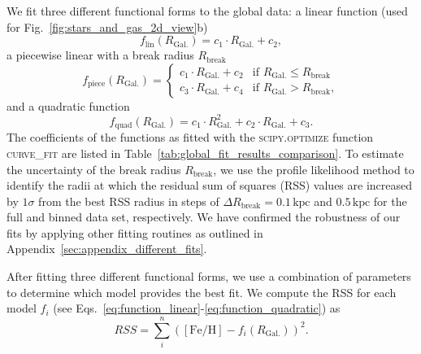 \documentclass[twocolumn,apj,numberedappendix,appendixfloats]{openjournal}
\begin{document}
\begin{CJK*}{UTF8}{gbsn}
We fit three different functional forms to the global data: a linear function (used for Fig.~\ref{fig:stars_and_gas_2d_view}b)
\begin{equation}
f_{\text{lin}}(R_\mathrm{Gal.}) = c_1 \cdot R_\mathrm{Gal.} + c_2, \label{eq:function_linear}
\end{equation}
a piecewise linear with a break radius $R_\mathrm{break}$
\begin{equation}
f_{\text{piece}}(R_\mathrm{Gal.}) = 
\begin{cases} 
c_1 \cdot R_\mathrm{Gal.} + c_2 & \text{if } R_\mathrm{Gal.} \leq R_\mathrm{break} \\
c_3 \cdot R_\mathrm{Gal.} + c_4 & \text{if } R_\mathrm{Gal.} > R_\mathrm{break},  \label{eq:function_piecewise}
\end{cases}
\end{equation}
and a quadratic function
\begin{equation}
f_{\text{quad}}(R_\mathrm{Gal.}) = c_1 \cdot R_\mathrm{Gal.}^2 + c_2 \cdot R_\mathrm{Gal.} + c_3.  \label{eq:function_quadratic}
\end{equation}
The coefficients of the functions as fitted with the \textsc{scipy.optimize} function \textsc{curve\_fit} \citep{Scipy} are listed in Table~\ref{tab:global_fit_results_comparison}. To estimate the uncertainty of the break radius $R_\mathrm{break}$, we use the profile likelihood method to identify the radii at which the residual sum of squares (RSS) values are increased by $1\sigma$ from the best RSS radius in steps of $\Delta R_\mathrm{break} = 0.1\,\mathrm{kpc}$ and $0.5\,\mathrm{kpc}$ for the full and binned data set, respectively. We have confirmed the robustness of our fits by applying other fitting routines as outlined in Appendix~\ref{sec:appendix_different_fits}.

After fitting three different functional forms, we use a combination of parameters to determine which model provides the best fit. We compute the RSS for each model $f_i$ (see Eqs.~\ref{eq:function_linear}-\ref{eq:function_quadratic}) as 
\begin{equation} \label{eq:rss}
    RSS = \sum_i^n \left( \mathrm{[Fe/H]} - f_i(R_\mathrm{Gal.}) \right)^2.
\end{equation}


\end{CJK*}
\end{document}

